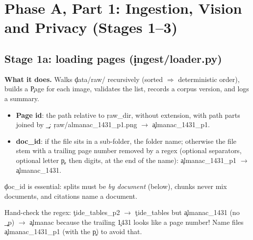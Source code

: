 \chapter{Phase A, Part 1: Ingestion, Vision and Privacy (Stages 1--3)}
\section{Stage 1a: loading pages (\c{ingest/loader.py})}
\textbf{What it does.} Walks \c{data/raw/} recursively (sorted $\Rightarrow$ deterministic order), builds a \c{Page} for each image, validates the list, records a corpus version, and logs a summary.
\begin{itemize}
 \item \textbf{Page id}: the path relative to \c{raw\_dir}, without extension, with path parts joined by \c{\_}: \c{raw/almanac\_1431\_p1.png} $\to$ \c{almanac\_1431\_p1}.
 \item \textbf{doc\_id}: if the file sits in a sub-folder, the folder name; otherwise the file stem with a trailing page number removed by a regex (optional separators, optional letter \c{p}, then digits, at the end of the name): \c{almanac\_1431\_p1} $\to$ \c{almanac\_1431}.
\end{itemize}
\begin{why}
\c{doc\_id} is essential: splits must be \emph{by document} (below), chunks never mix documents, and citations name a document.
\end{why}
\begin{gotcha}
Hand-check the regex: \c{tide\_tables\_p2} $\to$ \c{tide\_tables} but \c{almanac\_1431} (no \c{\_p}) $\to$ \c{almanac} because the trailing \c{1431} looks like a page number! Name files \c{almanac\_1431\_p1} (with the \c{p}) to avoid that.
\end{gotcha}

